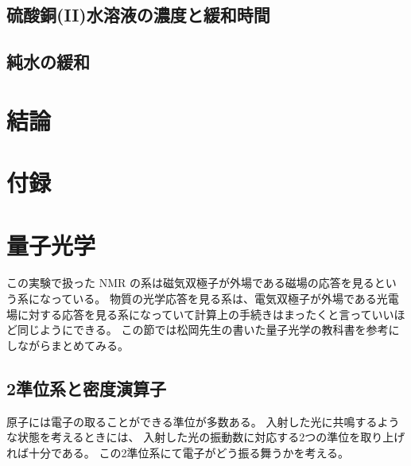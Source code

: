 \documentclass[11pt,dvipdfmx,a4paper]{jsarticle}
\begin{document}
\subsection{硫酸銅(II)水溶液の濃度と緩和時間}

\subsection{純水の緩和}

\section{結論}





\section*{付録}


\section{量子光学}
この実験で扱った NMR の系は磁気双極子が外場である磁場の応答を見るという系になっている。
物質の光学応答を見る系は、電気双極子が外場である光電場に対する応答を見る系になっていて計算上の手続きはまったくと言っていいほど同じようにできる。
この節では松岡先生の書いた量子光学の教科書\cite{Matsuoka_2000}を参考にしながらまとめてみる。
\subsection{2準位系と密度演算子}
原子には電子の取ることができる準位が多数ある。
入射した光に共鳴するような状態を考えるときには、
入射した光の振動数に対応する2つの準位を取り上げれば十分である。
この2準位系にて電子がどう振る舞うかを考える。
\end{document}
